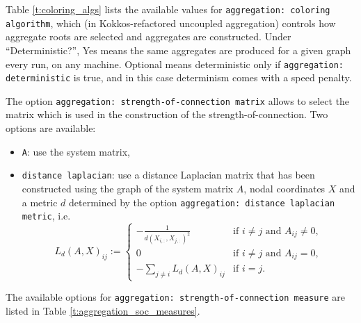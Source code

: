 Table \ref{t:coloring_algs} lists the available values for \verb!aggregation: coloring algorithm!, which (in Kokkos-refactored uncoupled aggregation) controls how aggregate roots are selected and aggregates are constructed. Under ``Deterministic?'', Yes means the same aggregates are produced for a given graph every run, on any machine. Optional means deterministic only if \verb!aggregation: deterministic! is true, and in this case determinism comes with a speed penalty.



The option \texttt{aggregation: strength-of-connection matrix} allows to select the matrix which is used in the construction of the strength-of-connection.
Two options are available:
\begin{itemize}
\item \texttt{A}: use the system matrix,
\item \texttt{distance laplacian}: use a distance Laplacian matrix that has been constructed using the graph of the system matrix \(A\), nodal coordinates \(X\) and a metric \(d\) determined by the option \texttt{aggregation: distance laplacian metric}, i.e.
  \begin{equation}
    L_{d}(A, X)_{ij} :=
    \begin{cases}
      -\frac{1}{d(X_{i,:},X_{j,:})^{2}} & \text{if } i\neq j \text{ and } A_{ij}\neq 0,\\
      0 & \text{if } i\neq j \text{ and } A_{ij}= 0,\\
      -\sum_{j\neq i}L_{d}(A, X)_{ij} & \text{if } i=j.
    \end{cases}
  \end{equation}
\end{itemize}

The available options for \texttt{aggregation: strength-of-connection measure} are listed in Table \ref{t:aggregation_soc_measures}.


